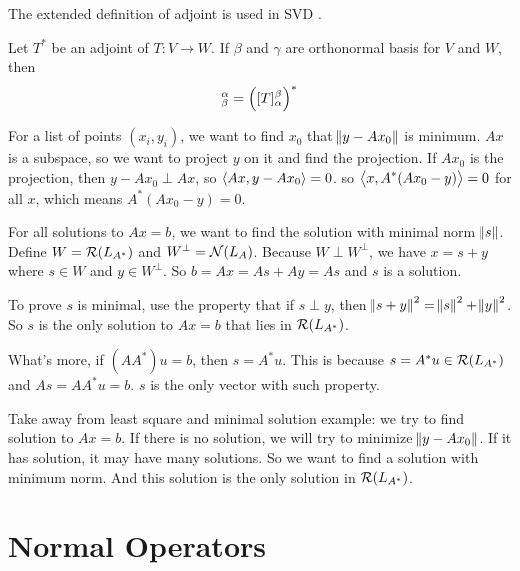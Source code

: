 The extended definition of adjoint is used in SVD .

\begin{theorem}
    Let $T^*$ be an adjoint of $T: V \rightarrow W$. If $\beta$ and $\gamma$ are orthonormal basis for $V$ and $W$, then
    \begin{equation}
        [T^*]_\beta^\alpha = \mleft( [T]_\alpha^\beta \mright)^*
    \end{equation}
\end{theorem}



\begin{example}
    For a list of points $(x_i, y_i)$, we want to find $x_0$ that $\norm{y - Ax_0}$ is minimum. $Ax$ is a subspace, so we want to project $y$ on it and find the projection. If $Ax_0$ is the projection, then $y - Ax_0 \perp Ax$, so $\innerproduct{Ax}{y - Ax_0} = 0$. so $\innerproduct{x}{A^* (Ax_0 - y)} = 0$ for all $x$, which means $A^* (Ax_0 - y) = 0$.
\end{example}

\begin{example}
    For all solutions to $Ax=b$, we want to find the solution with minimal norm $\norm{s}$. Define $W = \rangespace{L_{A^*}}$ and $W^\perp = \nullspace{L_A}$. Because $W \perp W^\perp$, we have $x = s + y$ where $s \in W$ and $y \in W^\perp$. So $b = Ax = As + Ay = As$ and $s$ is a solution.
    
    To prove $s$ is minimal, use the property that if $s \perp y$, then $\norm{s+y}^2 = \norm{s}^2 + \norm{y}^2$. So $s$ is the only solution to $Ax=b$ that lies in $\rangespace{L_{A^*}}$.
    
    What's more, if $(AA^*)u = b$, then $s = A^* u$. This is because $s = A^* u \in \rangespace{L_{A^*}}$ and $As = AA^*u = b$. $s$ is the only vector with such property.
\end{example}

Take away from least square and minimal solution example: we try to find solution to $Ax = b$. If there is no solution, we will try to minimize $\norm{y - A x_0}$. If it has solution, it may have many solutions. So we want to find a solution with minimum norm. And this solution is the only solution in $\rangespace{L_{A^*}}$.




\section{Normal Operators}

